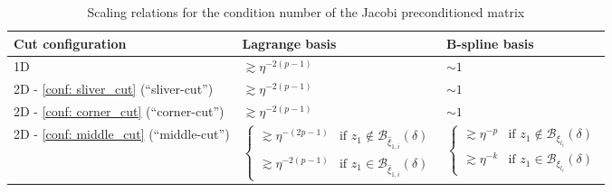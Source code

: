 \documentclass{article}
\numberwithin{equation}{section}
\theoremstyle{definition}
\begin{document}
\begin{table}[H]
\centering
\begin{tabular}{lll}
    \toprule
    Cut configuration & Lagrange basis & B-spline basis \\
    \midrule
    1D & $\gtrsim \eta^{-2(p-1)}$ & $\sim 1$ \\
    2D - \ref{conf: sliver_cut} (``sliver-cut'') & $ \gtrsim \eta^{-2(p-1)}$ & $\sim 1$ \\
    2D - \ref{conf: corner_cut} (``corner-cut'') & $ \gtrsim \eta^{-2(p-1)}$ & $\sim 1$ \\
    2D - \ref{conf: middle_cut} (``middle-cut'') & $
        \begin{cases}
            \gtrsim \eta^{-(2p-1)} &  \text{if } z_1 \notin \mathcal{B}_{\hat{\xi}_{1,i}}(\delta) \\
            \gtrsim \eta^{-2(p-1)} &  \text{if } z_1 \in \mathcal{B}_{\hat{\xi}_{1,i}}(\delta) 
        \end{cases}$ & $
        \begin{cases}
            \gtrsim \eta^{-p} &  \text{if } z_1 \notin \mathcal{B}_{\xi_{l_i}}(\delta) \\
            \gtrsim \eta^{-k} &  \text{if } z_1 \in \mathcal{B}_{\xi_{l_i}}(\delta) 
        \end{cases}$ \\
    \bottomrule
\end{tabular}
\caption{Scaling relations for the condition number of the Jacobi preconditioned matrix}
\label{tab: scaling_jacobi}
\end{table}
\end{document}
